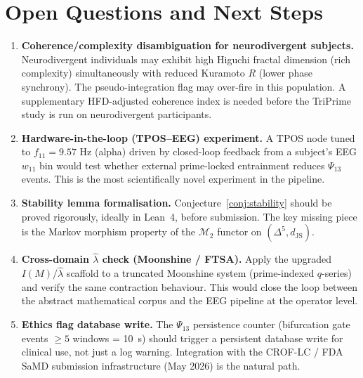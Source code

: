 \documentclass[12pt,a4paper]{article}
\theoremstyle{plain}
\theoremstyle{definition}
\newcommand{\hatlambda}{\hat{\lambda}}
\newcommand{\dJS}{d_{\mathrm{JS}}}
\renewcommand{\Psi}{\varPsi}
\begin{document}
\section{Open Questions and Next Steps}
\label{sec:open}

\begin{enumerate}[label=\textbf{Q\arabic*.}, leftmargin=2.5em]
  \item \textbf{Coherence/complexity disambiguation for neurodivergent subjects.}
        Neurodivergent individuals may exhibit high Higuchi fractal dimension (rich
        complexity) simultaneously with reduced Kuramoto $R$ (lower phase synchrony).
        The pseudo-integration flag may over-fire in this population.  A supplementary
        HFD-adjusted coherence index is needed before the TriPrime study is run on
        neurodivergent participants.

  \item \textbf{Hardware-in-the-loop (TPOS--EEG) experiment.}
        A TPOS node tuned to $f_{11} = 9.57$ Hz (alpha) driven by closed-loop
        feedback from a subject's EEG $w_{11}$ bin would test whether external
        prime-locked entrainment reduces $\Psi_{13}$ events.  This is the most
        scientifically novel experiment in the pipeline.

  \item \textbf{Stability lemma formalisation.}
        Conjecture~\ref{conj:stability} should be proved rigorously, ideally in
        Lean~4, before submission.  The key missing piece is the Markov morphism
        property of the $\mathcal{M}_2$ functor on $(\Delta^5, \dJS)$.

  \item \textbf{Cross-domain $\hatlambda$ check (Moonshine / FTSA).}
        Apply the upgraded $I(M)/\hatlambda$ scaffold to a truncated Moonshine system
        (prime-indexed $q$-series) and verify the same contraction behaviour.
        This would close the loop between the abstract mathematical corpus and the
        EEG pipeline at the operator level.

  \item \textbf{Ethics flag database write.}
        The $\Psi_{13}$ persistence counter (bifurcation gate events $\geq 5$ windows =
        10~s) should trigger a persistent database write for clinical use, not just
        a log warning.  Integration with the CROF-LC / FDA SaMD submission infrastructure
        (May 2026) is the natural path.
\end{enumerate}
\end{document}

